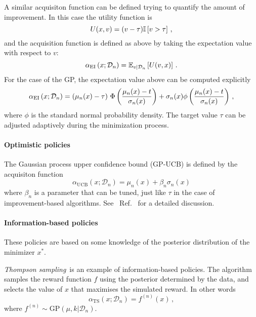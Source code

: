 A similar acquisiton function can be defined trying to quantify the amount of
improvement. In this case the utility function is
\begin{equation}
    \label{eq:EIUtil}
    U(x,v) = (v-\tau) \mathbb{I}\left[v>\tau\right]\, ,
\end{equation}
and the acquisition function is defined as above by taking the expectation value with respect to $v$:
\begin{equation}
    \label{eq:EIAcq}
    \alpha_{\mathrm{EI}} \left(x;\mathcal{D}_n\right) = 
    \mathbb{E}_{v|\mathcal{D}_n}\left[U(v,x)\right]\, .
\end{equation}
For the case of the GP, the expectation value above can be computed explicitly
\begin{equation}
    \label{eq:EIAcqGP}
    \alpha_{\mathrm{EI}} \left(x;\mathcal{D}_n\right) = 
    \left(\mu_n(x)-\tau\right) \, 
    \Phi\left(\frac{\mu_n(x)-t}{\sigma_n(x)}\right)
    + \sigma_n(x) \phi\left(\frac{\mu_n(x)-t}{\sigma_n(x)}\right)\, ,
\end{equation}
where $\phi$ is the standard normal probability density. The target value $\tau$
can be adjusted adaptively during the minimization process.

\paragraph[]{Optimistic policies}

The Gaussian process upper confidence bound (GP-UCB) is defined by the
acquisiton function 
\begin{equation}
    \label{eq:GB-UCB}
    \alpha_\mathrm{UCB}\left(x;\mathcal{D}_n\right) = 
        \mu_n(x) + \beta_n \sigma_n(x)
\end{equation}
where $\beta_n$ is a parameter that can be tuned, just like $\tau$ in the case
of improvement-based algorithms. See \eg\ Ref.~\cite{Srinivas_2012} for a
detailed discussion.  

\paragraph[]{Information-based policies}

These policies are based on some knowledge of the posterior distribution of the minimizer $x^*$.

{\em Thompson sampling}\ is an example of information-based policies. The
algorithm samples the reward function $f$ using the posterior determined by the
data, and selects the value of $x$ that maximises the simulated reward. In other words
\begin{equation}
    \label{eq:TSAcq}
    \alpha_\mathrm{TS}\left(x;\mathcal{D}_n\right) = 
    f^{(n)}(x)\, ,
\end{equation} 
where $f^{(n)}\sim \mathrm{GP}\left(\mu,k|\mathcal{D}_n\right)$.

